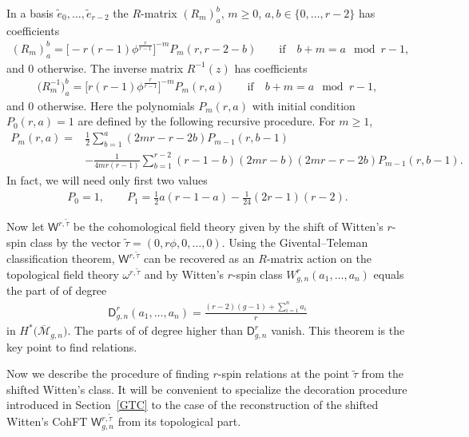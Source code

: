 \documentclass[10pt,a4paper]{amsart}
\def\D{\mathsf{D}}
\numberwithin{equation}{section}
\begin{document}
In a basis $\widetilde{e}_0,\dots,\widetilde{e}_{r-2}$ the $R$-matrix $(R_m)^b_a$, $m\geq 0$, $a,b \in\{0,\dots,r-2\}$ has coefficients
\begin{align*}
(R_m)^b_a = \bigl[-r(r-1)\phi^{\frac{r}{r-1}}\bigr]^{-m} P_m(r,r-2-b) \qquad
 \mbox{if} \quad b+m = a \mod{r-1},
\end{align*}
and 0 otherwise.
The inverse matrix $R^{-1}(z)$ has coefficients
\begin{align*}
\big(R_m^{-1}\big)^b_a = \big[r(r-1)\phi^{\frac{r}{r-1}}\big]^{-m} P_m(r,a) \qquad
 \mbox{if} \quad b+m = a \mod{r-1},
 \end{align*}
 and 0 otherwise.
Here the polynomials $P_m(r,a)$ with initial condition $P_0(r,a) = 1$ are defined by the following recursive procedure. For $m \geq 1$,
\begin{align*}
P_m(r,a)={}&
\frac12\sum_{b=1}^a (2mr-r-2b) P_{m-1}(r,b-1)\nonumber\\
& - \frac1{4mr(r-1)}
\sum_{b=1}^{r-2} (r-1-b)(2mr-b)(2mr-r-2b) P_{m-1}(r,b-1) .\label{Eq:DefP}
\end{align*}
In fact, we will need only first two values
\begin{align*}
P_0 = 1, \qquad
P_1 = \frac12 a(r-1-a) - \frac1{24}(2r-1)(r-2).
\end{align*}

Now let $\mathsf{W}^{r,\widetilde{\tau}}$ be the cohomological field theory given by the shift of Witten's
$r$-spin class by the vector $\widetilde{\tau} = (0, r \phi, 0,\ldots, 0)$. Using the Givental--Teleman classification theorem, $\mathsf{W}^{r,\widetilde{\tau}}$ can be recovered as an $R$-matrix action on the topological field theory $\omega ^{r,\widetilde{\tau}}$ and by \cite[Theorem~9]{PPZ16} Witten's $r$-spin class $W^r_{g,n}(a_1,\dots,a_n)$ equals the part of  of degree
\begin{align*}
\D^r_{g,n}(a_1, \dots, a_n) = \frac{(r-2)(g-1) + \sum_{i=1}^n a_i}r
\end{align*}
in $H^*\big(\overline{\mathcal{M}}_{g,n}\big)$.
The parts of  of degree
higher than $\D^r_{g,n}$ vanish. This theorem is the key point to find relations.


Now we describe the procedure of finding $r$-spin relations at the point $\widetilde{\tau}$ from the shifted Witten's class. It will be convenient to specialize the decoration procedure introduced in Section~\ref{GTC} to the case of the reconstruction of the shifted Witten's CohFT $\mathsf{W}^{r, \widetilde{\tau}}_{g,n}$ from its topological part.
\end{document}
